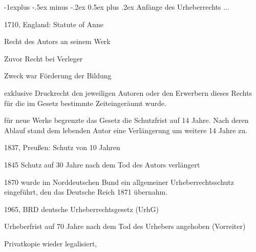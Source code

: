 \documentclass[a4paper, 8pt]{article}
\makeatletter
\renewcommand{\subsection}{\@startsection{subsection}{2}{0mm}%
                                {-1explus -.5ex minus -.2ex}%
                                {0.5ex plus .2ex}%
                                {\normalfont\normalsize\bfseries}}
\makeatother
\begin{document}
\begin{multicols*}{2}
  \subsection{Anfänge des Urheberrechts ...}
  \begin{itemize*}
    \item 1710, England: Statute of Anne
    \begin{itemize*}
      \item Recht des Autors an seinem Werk
      \item Zuvor Recht bei Verleger
      \item Zweck war Förderung der Bildung
      \item exklusive Druckrecht den jeweiligen Autoren oder den Erwerbern dieses Rechts für die im Gesetz bestimmte Zeiteingeräumt wurde.
      \item für neue Werke begrenzte das Gesetz die Schutzfrist auf 14 Jahre. Nach deren Ablauf stand dem lebenden Autor eine Verlängerung um weitere 14 Jahre zu.
    \end{itemize*}
    \item 1837, Preußen: Schutz von 10 Jahren
    \item 1845 Schutz auf 30 Jahre nach dem Tod des Autors verlängert
    \item 1870 wurde im Norddeutschen Bund ein allgemeiner Urheberrechtsschutz eingeführt, den das Deutsche Reich 1871 übernahm.
    \item 1965, BRD deutsche Urheberrechtsgesetz (UrhG)
    \begin{itemize*}
      \item Urheberfrist auf 70 Jahre nach dem Tod des Urhebers angehoben (Vorreiter)
      \item Privatkopie wieder legalisiert,
    \end{itemize*}
  \end{itemize*}


\end{multicols*}
\end{document}
